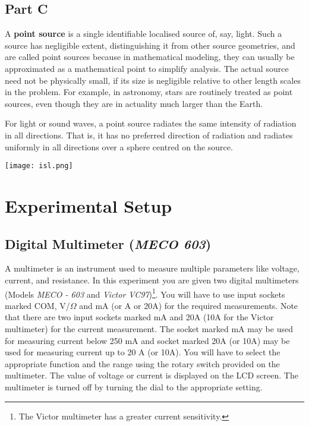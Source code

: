 \subsection*{Part C}


\begin{minipage}{0.5\linewidth}
A \textbf{point source} is a single identifiable localised source of, say, light. Such a source has negligible extent, distinguishing it from other source geometries, and are called point sources because in mathematical modeling, they can usually be approximated as a mathematical point to simplify analysis. The actual source need not be physically small, if its size is negligible relative to other length scales in the problem. For example, in astronomy, stars are routinely treated as point sources, even though they are in actuality much larger than the Earth.

For light or sound waves, a point source radiates the same intensity of radiation in all directions. That is, it has no preferred direction of radiation and radiates uniformly in all directions over a sphere centred on the source.
\end{minipage}
\begin{minipage}{0.5\linewidth}
\centering
\texttt{[image: isl.png]}
\end{minipage}



\section*{Experimental Setup}

\subsection*{Digital Multimeter (\textit{MECO 603})}

A multimeter is an instrument used to measure multiple parameters like voltage, current, and resistance. In this experiment you are given two digital multimeters (Models \textit{MECO - 603} and \textit{Victor VC97})\footnote{The Victor multimeter has a greater current sensitivity.}. You will have to use input sockets marked COM, V/$\Omega$ and mA (or A or 20A) for the required measurements. Note that there are two input sockets marked mA and 20A (10A for the Victor multimeter) for the current measurement. The socket marked mA may be used for measuring current below 250 mA and socket marked 20A (or 10A) may be used for measuring current up to 20 A (or 10A). You will have to select the appropriate function and the range using the rotary switch provided on the multimeter. The value of voltage or current is displayed on the LCD screen. The multimeter is turned off by turning the dial to the appropriate setting.

